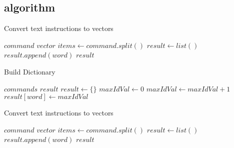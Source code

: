 \documentclass[preprint,12pt]{elsarticle}
\begin{document}
    \subsection{algorithm}


    \begin{algorithm}
        \caption{Convert text instructions to vectors}
        \begin{algorithmic}[1]
            \Require $command$
            \Ensure $vector$
            \State $ items \gets command.split() $
            \State $ result \gets list() $
            \State $ result.append(word) $
            \EndFor
            \State \Return $result$
            \EndFunction
        \end{algorithmic}
    \end{algorithm}

    \begin{algorithm}
        \caption{Build Dictionary}
        \begin{algorithmic}[1]
            \Require $commands$
            \Ensure $result$
            \State $result \gets \{\} $
            \State $maxIdVal \gets 0 $
            \State $maxIdVal \gets maxIdVal + 1$
            \State $result[word] \gets maxIdVal$
            \EndIf
            \EndFor
            \EndFor
            \State {}
            \EndFunction
        \end{algorithmic}
    \end{algorithm}

    \begin{algorithm}
        \caption{Convert text instructions to vectors}
        \begin{algorithmic}[1]
            \Require $command$
            \Ensure $vector$
            \State $ items \gets command.split() $
            \State $ result \gets list() $
            \State $ result.append(word) $
            \EndFor
            \State \Return $result$
            \EndFunction
        \end{algorithmic}
    \end{algorithm}
\end{document}
